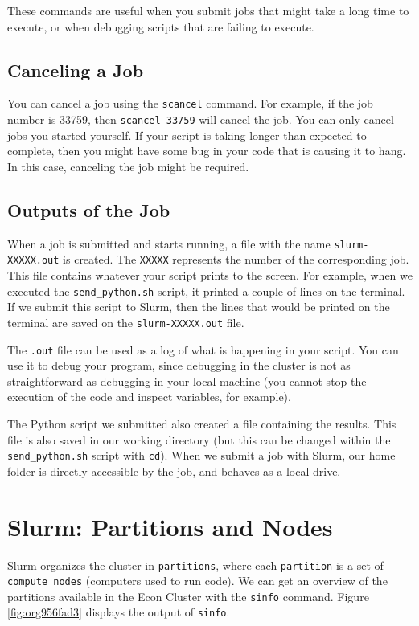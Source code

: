\documentclass[12pt, a4paper]{article}
\begin{document}
These commands are useful when you submit jobs that might take a long time to execute, or when debugging scripts that are failing to execute.
\subsection{Canceling a Job}
\label{sec:org6ba0762}
You can cancel a job using the \texttt{scancel} command.
For example, if the job number is 33759, then \texttt{scancel 33759} will cancel the job.
You can only cancel jobs you started yourself.
If your script is taking longer than expected to complete, then you might have some bug in your code that is causing it to hang.
In this case, canceling the job might be required.
\subsection{Outputs of the Job}
\label{sec:org1d178a1}
When a job is submitted and starts running, a file with the name \texttt{slurm-XXXXX.out} is created.
The \texttt{XXXXX} represents the number of the corresponding job.
This file contains whatever your script prints to the screen.
For example, when we executed the \texttt{send\_python.sh} script, it printed a couple of lines on the terminal.
If we submit this script to Slurm, then the lines that would be printed on the terminal are saved on the \texttt{slurm-XXXXX.out} file.

The \texttt{.out} file can be used as a log of what is happening in your script.
You can use it to debug your program, since debugging in the cluster is not as straightforward as debugging in your local machine (you cannot stop the execution of the code and inspect variables, for example).

The Python script we submitted also created a file containing the results.
This file is also saved in our working directory (but this can be changed within the \texttt{send\_python.sh} script with \texttt{cd}).
When we submit a job with Slurm, our home folder is directly accessible by the job, and behaves as a local drive.

\section{Slurm: Partitions and Nodes}
\label{sec:orgd8a7c72}
Slurm organizes the cluster in \texttt{partitions}, where each \texttt{partition} is a set of \texttt{compute nodes} (computers used to run code).
We can get an overview of the partitions available in the Econ Cluster with the \texttt{sinfo} command.
Figure \ref{fig:org956fad3} displays the output of \texttt{sinfo}.
\end{document}
